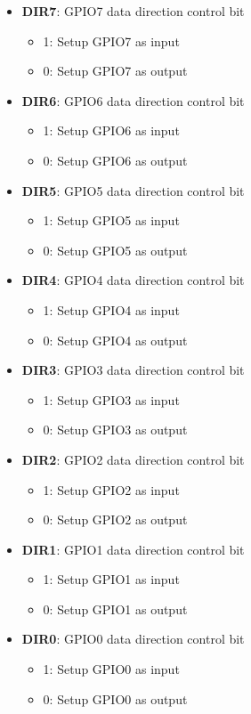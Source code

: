 \documentclass{article}
\begin{document}
		\begin{itemize}
			\item \textbf{DIR7}: GPIO7 data direction control bit
			\begin{itemize}
				\item 1: Setup GPIO7 as input
				\item 0: Setup GPIO7 as output
			\end{itemize}
			\item \textbf{DIR6}: GPIO6 data direction control bit
			\begin{itemize}
				\item 1: Setup GPIO6 as input
				\item 0: Setup GPIO6 as output
			\end{itemize}
			\item \textbf{DIR5}: GPIO5 data direction control bit
			\begin{itemize}
				\item 1: Setup GPIO5 as input
				\item 0: Setup GPIO5 as output
			\end{itemize}
			\item \textbf{DIR4}: GPIO4 data direction control bit
			\begin{itemize}
				\item 1: Setup GPIO4 as input
				\item 0: Setup GPIO4 as output
			\end{itemize}
			\item \textbf{DIR3}: GPIO3 data direction control bit
			\begin{itemize}
				\item 1: Setup GPIO3 as input
				\item 0: Setup GPIO3 as output
			\end{itemize}
			\item \textbf{DIR2}: GPIO2 data direction control bit
			\begin{itemize}
				\item 1: Setup GPIO2 as input
				\item 0: Setup GPIO2 as output
			\end{itemize}
			\item \textbf{DIR1}: GPIO1 data direction control bit
			\begin{itemize}
				\item 1: Setup GPIO1 as input
				\item 0: Setup GPIO1 as output
			\end{itemize}
			\item \textbf{DIR0}: GPIO0 data direction control bit
			\begin{itemize}
				\item 1: Setup GPIO0 as input
				\item 0: Setup GPIO0 as output
			\end{itemize}
			
		\end{itemize}
		
\end{document}
